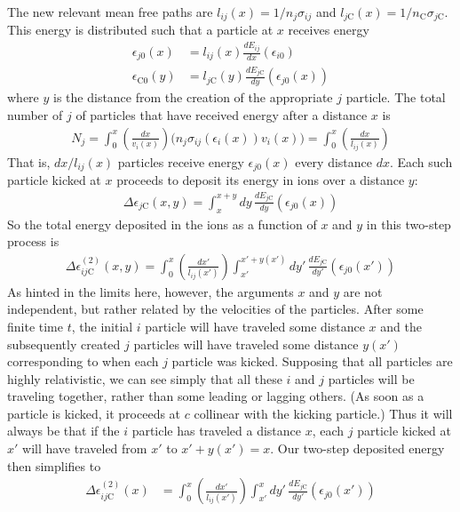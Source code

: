 \documentclass{article}
\begin{document}
The new relevant mean free paths are $l_{ij}(x) = 1/n_j\sigma_{ij}$ and $l_{j\text{C}}(x) = 1/n_\text{C}\sigma_{j\text{C}}$.  This energy is distributed such that a particle at $x$ receives energy
\begin{align}
\epsilon_{j0}(x) &= l_{ij}(x)\frac{dE_{ij}}{dx}(\epsilon_{i0}) \label{eqn:jInitialEnergy}\\
\epsilon_{\text{C}0}(y) &= l_{j\text{C}}(y)\frac{dE_{j\text{C}}}{dy}(\epsilon_{j0}(x))
\end{align}
where $y$ is the distance from the creation of the appropriate $j$ particle. The total number of $j$ of particles that have received energy after a distance $x$ is
\begin{align}
N_j = \int_0^x \left( \frac{dx}{v_i(x)} \right) \big( n_j\sigma_{ij}(\epsilon_i(x))v_i(x) \big) = \int_0^x \left( \frac{dx}{l_{ij}(x)} \right)
\end{align}
That is, $dx / l_{ij}(x)$ particles receive energy $\epsilon_{j0}(x)$ every distance $dx$. Each such particle kicked at $x$ proceeds to deposit its energy in ions over a distance $y$:
\begin{align}
\Delta \epsilon_{j\text{C}}(x,y) = \int_x^{x+y} dy\, \frac{dE_{j\text{C}}}{dy}(\epsilon_{j0}(x))
\end{align}
So the total energy deposited in the ions as a function of $x$ and $y$ in this two-step process is
\begin{align}
\Delta \epsilon_{ij\text{C}}^{(2)}(x,y) = \int_0^x \left( \frac{dx'}{l_{ij}(x')} \right) \int_{x'}^{x'+y(x')} dy'\, \frac{dE_{j\text{C}}}{dy'}(\epsilon_{j0}(x'))
\end{align}
As hinted in the limits here, however, the arguments $x$ and $y$ are not independent, but rather related by the velocities of the particles. After some finite time $t$, the initial $i$ particle will have traveled some distance $x$ and the subsequently created $j$ particles will have traveled some distance $y(x')$ corresponding to when each $j$ particle was kicked. Supposing that all particles are highly relativistic, we can see simply that all these $i$ and $j$ particles will be traveling together, rather than some leading or lagging others. (As soon as a particle is kicked, it proceeds at $c$ collinear with the kicking particle.) Thus it will always be that if the $i$ particle has traveled a distance $x$, each $j$ particle kicked at $x'$ will have traveled from $x'$ to $x' + y(x') = x$. Our two-step deposited energy then simplifies to
\begin{align}
\Delta \epsilon_{ij\text{C}}^{(2)}(x) &= \int_0^x \left( \frac{dx'}{l_{ij}(x')} \right) \int_{x'}^x dy'\, \frac{dE_{j\text{C}}}{dy'}(\epsilon_{j0}(x'))
\end{align}
\end{document}
